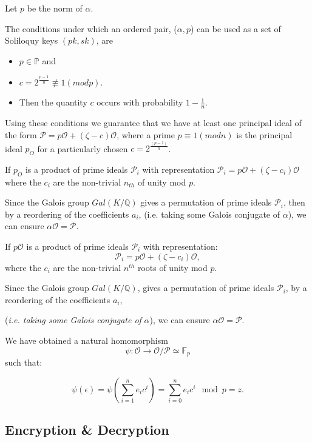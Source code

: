 Let $p$ be the norm of $\alpha$.

The conditions under which an ordered pair, ($\alpha, p$) can be used as a set of Soliloquy keys $(pk, sk)$, are 
\begin{itemize}
\item $p \in \mathbb{P}$  and 
\item $c=2^{\frac{p-1}{n}} \not\equiv 1(mod p)$.
\item Then the quantity $c$ occurs with probability $1-\frac{1}{n}$. 
\end{itemize}

Using these conditions we guarantee that we have at least one principal ideal of the form  $\mathcal{P} = p \mathcal{O} + (\zeta-c) \mathcal{O}$, where a prime $p \equiv 1(mod n)$ is the principal ideal $p_{O}$  for a particularly chosen $c = 2^{\frac{(p-1)}{n}}$. 

If $p_{O}$ is a product of prime ideals $\mathcal{P}_{i}$ with representation $\mathcal{P}_{i} = p\mathcal{O} + (\zeta-c_{i}) \mathcal{O}$ where the $c_{i}$ are the non-trivial $n_{th}$ of unity mod $p$. 

Since the Galois group $Gal(K/\mathbb{Q})$ gives a permutation of prime ideals $\mathcal{P}_{i}$, then by a reordering of the coefficients $a_{i}$, (i.e. taking some Galois conjugate of $\alpha$), we can ensure $\alpha \mathcal{O} = \mathcal{P}$. 

If $p \mathcal{O}$ is a product of prime ideals $\mathcal{P}_{i}$ with representation:  
\[\mathcal{P}_{i} = p\mathcal{O} + (\zeta-c_{i}) \mathcal{O},\]
 where the $c_{i}$ are the non-trivial $n^{th}$ roots of unity mod $p$. 
  
Since the Galois group $Gal(K/ \mathbb{Q})$, gives a permutation of prime ideals $\mathcal{P}_{i}$, by a reordering of the coefficients $a_{i}$, 

(\textit{i.e. taking some Galois conjugate of} $\mathit{\alpha}$), we can ensure $ \alpha \mathcal{O} = \mathcal{P}$. 
 
We have obtained a natural homomorphism  \[\psi : \mathcal{O} \rightarrow \mathcal{O}/ \mathcal{P} \simeq \mathbb{F}_{p}\] such that: 

\[ \psi(\epsilon) = \psi \left( \sum_{i=1}^{n}e_{i}c^{i} \right) = \sum_{i=0}^{n} e_{i}c^{i}\mod{p}=z. \]
  
  
  
\subsection{Encryption \& Decryption}

